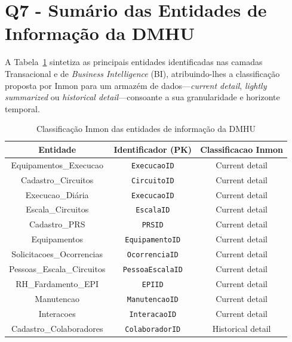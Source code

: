 \documentclass[12pt,a4paper,final]{article}
\begin{document}
    \section*{Q7 - Sumário das Entidades de Informação da DMHU}
    A Tabela~\ref{tab:inmon} sintetiza as principais entidades identificadas nas
    camadas Transacional e de \textit{Business Intelligence} (BI), atribuindo-lhes a
    classificação proposta por Inmon para um armazém de dados—\emph{current
    detail}, \emph{lightly summarized} ou \emph{historical detail}—consoante a sua
    granularidade e horizonte temporal.

    \begin{table}[]
        \centering
        \caption{Classificação Inmon das entidades de informação da DMHU}
        \label{tab:inmon}
        \begin{tabular}{@{}|c|c|c|@{}}
            \toprule
            \textbf{Entidade} & \textbf{Identificador (PK)} & \textbf{Classificacao Inmon}\\\midrule
            Equipamentos\_Execucao          & \texttt{ExecucaoID}         & Current detail\\
            Cadastro\_Circuitos             & \texttt{CircuitoID}         & Current detail\\
            Execucao\_Diária                & \texttt{ExecucaoID}         & Current detail\\
            Escala\_Circuitos               & \texttt{EscalaID}           & Current detail\\
            Cadastro\_PRS                   & \texttt{PRSID}             & Current detail\\
            Equipamentos                    & \texttt{EquipamentoID}      & Current detail\\
            Solicitacoes\_Ocorrencias       & \texttt{OcorrenciaID}       & Current detail\\
            Pessoas\_Escala\_Circuitos      & \texttt{PessoaEscalaID}     & Current detail\\
            RH\_Fardamento\_EPI             & \texttt{EPIID}              & Current detail\\
            Manutencao                      & \texttt{ManutencaoID}       & Current detail\\
            Interacoes                      & \texttt{InteracaoID}        & Current detail\\
            Cadastro\_Colaboradores         & \texttt{ColaboradorID}      & Historical detail\\

\end{tabular}
\end{table}
\end{document}
